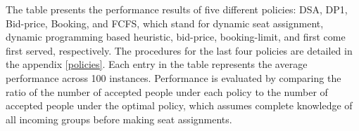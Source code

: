The table presents the performance results of five different policies: DSA, DP1, Bid-price, Booking, and FCFS, which stand for dynamic seat assignment, dynamic programming based heuristic, bid-price, booking-limit, and first come first served, respectively. The procedures for the last four policies are detailed in the appendix \ref{policies}. Each entry in the table represents the average performance across 100 instances. Performance is evaluated by comparing the ratio of the number of accepted people under each policy to the number of accepted people under the optimal policy, which assumes complete knowledge of all incoming groups before making seat assignments.









